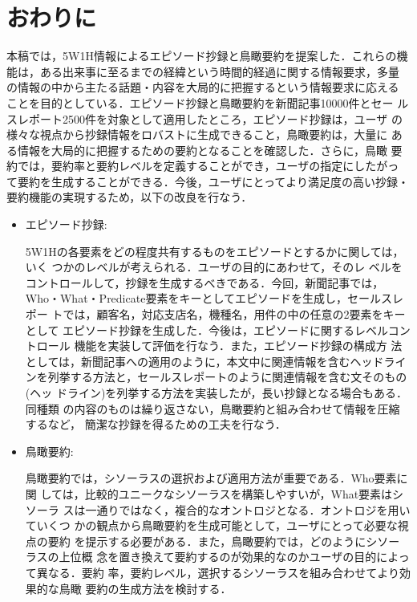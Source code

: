 \vspace{1.0cm}

\section{おわりに}
本稿では，5W1H情報によるエピソード抄録と鳥瞰要約を提案した．これらの機
能は，ある出来事に至るまでの経緯という時間的経過に関する情報要求，多量
の情報の中から主たる話題・内容を大局的に把握するという情報要求に応える
ことを目的としている．エピソード抄録と鳥瞰要約を新聞記事10000件とセー
ルスレポート2500件を対象として適用したところ，エピソード抄録は，ユーザ
の様々な視点から抄録情報をロバストに生成できること，鳥瞰要約は，大量に
ある情報を大局的に把握するための要約となることを確認した．さらに，鳥瞰
要約では，要約率と要約レベルを定義することができ，ユーザの指定にしたがっ
て要約を生成することができる．今後，ユーザにとってより満足度の高い抄録・
要約機能の実現するため，以下の改良を行なう．

\begin{itemize}
  \item エピソード抄録:

5W1Hの各要素をどの程度共有するものをエピソードとするかに関しては，いく
つかのレベルが考えられる\cite{ikeda97}．ユーザの目的にあわせて，そのレ
ベルをコントロールして，抄録を生成するべきである．今回，新聞記事では，
Who・What・Predicate要素をキーとしてエピソードを生成し，セールスレポー
トでは，顧客名，対応支店名，機種名，用件の中の任意の2要素をキーとして
エピソード抄録を生成した．今後は，エピソードに関するレベルコントロール
機能を実装して評価を行なう\cite{ikeda97}．また，エピソード抄録の構成方
法としては，新聞記事への適用のように，本文中に関連情報を含むヘッドライ
ンを列挙する方法と，セールスレポートのように関連情報を含む文そのもの(ヘッ
ドライン)を列挙する方法を実装したが，長い抄録となる場合もある．同種類
の内容のものは繰り返さない，鳥瞰要約と組み合わせて情報を圧縮するなど，
簡潔な抄録を得るための工夫を行なう．

  \item 鳥瞰要約:

鳥瞰要約では，シソーラスの選択および適用方法が重要である．Who要素に関
しては，比較的ユニークなシソーラスを構築しやすいが，What要素はシソーラ
スは一通りではなく，複合的なオントロジとなる．オントロジを用いていくつ
かの観点から鳥瞰要約を生成可能として，ユーザにとって必要な視点の要約
を提示する必要がある．また，鳥瞰要約では，どのようにシソーラスの上位概
念を置き換えて要約するのが効果的なのかユーザの目的によって異なる．要約
率，要約レベル，選択するシソーラスを組み合わせてより効果的な鳥瞰
要約の生成方法を検討する．

\end{itemize}



